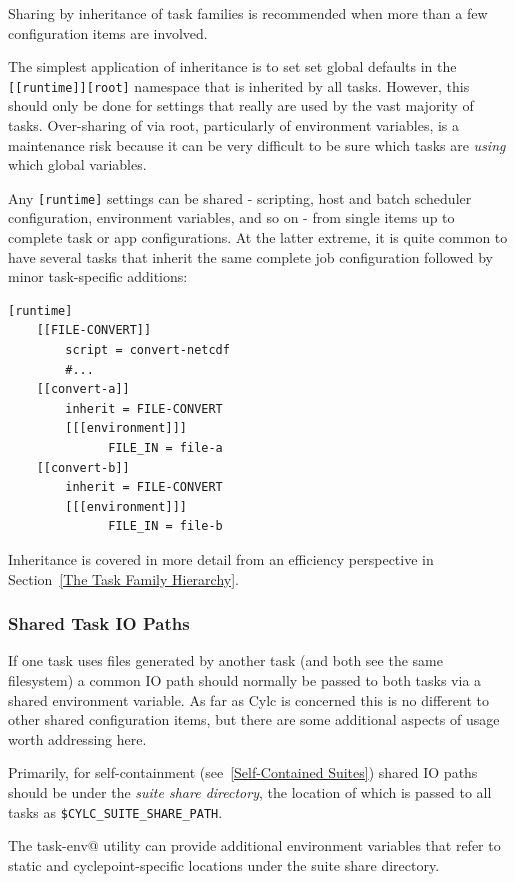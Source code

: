 Sharing by inheritance of task families is recommended when more than a few
configuration items are involved.

The simplest application of inheritance is to set set global defaults in the
\lstinline=[[runtime]][root]= namespace that is inherited by all tasks.
However, this should only be done for settings that really are used
by the vast majority of tasks. Over-sharing of via root, particularly of
environment variables, is a maintenance risk because it can be very
difficult to be sure which tasks are {\em using} which global variables.

Any \lstinline=[runtime]= settings can be shared - scripting, host
and batch scheduler configuration, environment variables, and so on - from
single items up to complete task or app configurations.  At the latter extreme,
it is quite common to have several tasks that inherit the same complete
job configuration followed by minor task-specific additions:

\lstset{language=suiterc}
\begin{lstlisting}
[runtime]
    [[FILE-CONVERT]]
        script = convert-netcdf
        #...
    [[convert-a]]
        inherit = FILE-CONVERT
        [[[environment]]]
              FILE_IN = file-a
    [[convert-b]]
        inherit = FILE-CONVERT
        [[[environment]]]
              FILE_IN = file-b
\end{lstlisting}

Inheritance is covered in more detail from an efficiency perspective in
Section~\ref{The Task Family Hierarchy}.

\subsubsection{Shared Task IO Paths}
\label{Shared Task IO Paths}

If one task uses files generated by another task (and both see the same
filesystem) a common IO path should normally be passed to both tasks via a
shared environment variable. As far as Cylc is concerned this is no different
to other shared configuration items, but there are some additional aspects
of usage worth addressing here.

Primarily, for self-containment (see~\ref{Self-Contained Suites}) shared IO
paths should be under the {\em suite share directory}, the location of which is
passed to all tasks as \lstinline=$CYLC_SUITE_SHARE_PATH=.

The \lstinline@rose task-env@ utility can provide additional environment
variables that refer to static and cyclepoint-specific locations under the
suite share directory.

